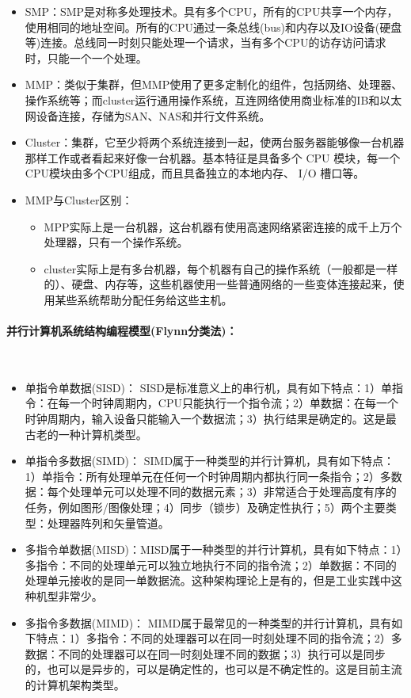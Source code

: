 \documentclass[UTF8]{article}%
\begin{document}
\begin{itemize}
    \item SMP：SMP是对称多处理技术。具有多个CPU，所有的CPU共享一个内存，使用相同的地址空间。所有的CPU通过一条总线(bus)和内存以及IO设备(硬盘等)连接。总线同一时刻只能处理一个请求，当有多个CPU的访存访问请求时，只能一个一个处理。
    \item MMP：类似于集群，但MMP使用了更多定制化的组件，包括网络、处理器、操作系统等；而cluster运行通用操作系统，互连网络使用商业标准的IB和以太网设备连接，存储为SAN、NAS和并行文件系统。
    \item Cluster：集群，它至少将两个系统连接到一起，使两台服务器能够像一台机器那样工作或者看起来好像一台机器。基本特征是具备多个 CPU 模块，每一个CPU模块由多个CPU组成，而且具备独立的本地内存、 I/O 槽口等。
    \item MMP与Cluster区别：
    
    {
        \begin{itemize}
            \item MPP实际上是一台机器，这台机器有使用高速网络紧密连接的成千上万个处理器，只有一个操作系统。
            \item cluster实际上是有多台机器，每个机器有自己的操作系统（一般都是一样的）、硬盘、内存等，这些机器使用一些普通网络的一些变体连接起来，使用某些系统帮助分配任务给这些主机。
        \end{itemize}
    }
\end{itemize}

\paragraph{并行计算机系统结构编程模型(Flynn分类法)：}~{}

\begin{itemize}
    \item 单指令单数据(SISD)： SISD是标准意义上的串行机，具有如下特点：1）单指令：在每一个时钟周期内，CPU只能执行一个指令流；2）单数据：在每一个时钟周期内，输入设备只能输入一个数据流；3）执行结果是确定的。这是最古老的一种计算机类型。
    \item 单指令多数据(SIMD)： SIMD属于一种类型的并行计算机，具有如下特点：1）单指令：所有处理单元在任何一个时钟周期内都执行同一条指令；2）多数据：每个处理单元可以处理不同的数据元素；3）非常适合于处理高度有序的任务，例如图形/图像处理；4）同步（锁步）及确定性执行；5）两个主要类型：处理器阵列和矢量管道。
    \item 多指令单数据(MISD)：MISD属于一种类型的并行计算机，具有如下特点：1）多指令：不同的处理单元可以独立地执行不同的指令流；2）单数据：不同的处理单元接收的是同一单数据流。这种架构理论上是有的，但是工业实践中这种机型非常少。
    \item 多指令多数据(MIMD)： MIMD属于最常见的一种类型的并行计算机，具有如下特点：1）多指令：不同的处理器可以在同一时刻处理不同的指令流；2）多数据：不同的处理器可以在同一时刻处理不同的数据；3）执行可以是同步的，也可以是异步的，可以是确定性的，也可以是不确定性的。这是目前主流的计算机架构类型。
\end{itemize}
\end{document}
